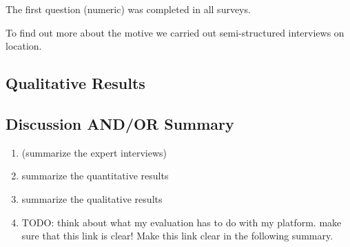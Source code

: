 	The first question (numeric) was completed in all surveys. 

	To find out more about the motive we carried out semi-structured interviews on location.


\subsection{Qualitative Results}



\subsection{Discussion AND/OR Summary}


	\begin{enumerate}
	\item (summarize the expert interviews)
	\item summarize the quantitative results
	\item summarize the qualitative results 
	\item TODO: think about what my evaluation has to do with my platform. make sure that this link is clear! Make this link clear in the following summary.
	\end{enumerate}



